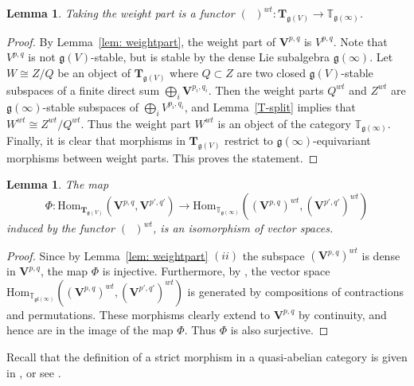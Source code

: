 \documentclass[12pt,reqno]{amsart}
\newcommand{\Hom}{\mathrm{Hom}}
\newtheorem{lem}[thm]{Lemma}
\theoremstyle{definition}
\theoremstyle{remark}
\begin{document}
        \begin{lem}
	    Taking the weight part is a functor $(\phantom{a})^{wt}: \mathbf{T}_{\mathfrak{g}(V)} \rightarrow \mathbb{T}_{\mathfrak{g}(\infty)}$.
	\end{lem}
        \begin{proof}
         By Lemma~\ref{lem: weightpart}, the weight part of $\mathbf{V}^{p,q}$ is $V^{p,q}$. Note that $V^{p,q}$ is not $\mathfrak{g}(V)$-stable, but is stable by the dense Lie subalgebra $\mathfrak{g}(\infty)$. Let $W\cong Z/Q$ be an object of $\mathbf{T}_{\mathfrak{g}(V)}$ where $Q\subset Z$ are two closed $\mathfrak{g}(V)$-stable subspaces of a finite direct sum  $\bigoplus_i \mathbf{V}^{p_i,q_i}$. Then the weight parts $Q^{wt}$ and $Z^{wt}$ are $\mathfrak{g}(\infty)$-stable subspaces of $\bigoplus_i V^{p_i,q_i}$, and Lemma~\ref{T-split} implies that $W^{wt} \cong Z^{wt}/Q^{wt}$. Thus the weight part $W^{wt}$ is an object of the category $\mathbb{T}_{\mathfrak{g}(\infty)}$. Finally, it is clear that morphisms in $\mathbf{T}_{\mathfrak{g}(V)}$ restrict to $\mathfrak{g}(\infty)$-equivariant morphisms between weight parts. This proves the statement.  
        \end{proof}

        \begin{lem}\label{lem:full}
	The map 
	$$\Phi:\Hom_{\mathbf{T}_{\mathfrak{g}(V)}}(\mathbf{V}^{p,q}, \mathbf{V}^{p', q'})
	\rightarrow
	\Hom_{\mathbb{T}_{\mathfrak{g}(\infty)}}((\mathbf{V}^{p,q})^{wt}, (\mathbf{V}^{p', q'})^{wt})
	$$
	induced by the functor $(\phantom{a})^{wt}$, is an isomorphism of vector spaces.
	\end{lem}
 \begin{proof}
     Since  by Lemma~\ref{lem: weightpart} $(ii)$ the subspace $(\mathbf{V}^{p,q})^{wt}$ is dense in $\mathbf{V}^{p,q}$, the map $\Phi$ is injective. Furthermore, by \cite[Section 6]{DPS}, the vector space $\Hom_{\mathbb{T}_{\mathfrak{gl}(\infty)}}((\mathbf{V}^{p,q})^{wt}, (\mathbf{V}^{p', q'})^{wt})$ is generated by compositions of contractions and permutations. These morphisms clearly extend  to $\mathbf{V}^{p,q}$ by continuity, and hence are in the image of the map $\Phi$. Thus $\Phi$ is also surjective.
 \end{proof}

        Recall that the definition of a strict morphism in a quasi-abelian category is given in \cite[1.1.7]{Sch},  or see \cite[Section~2]{EP}.
        
\end{document}
